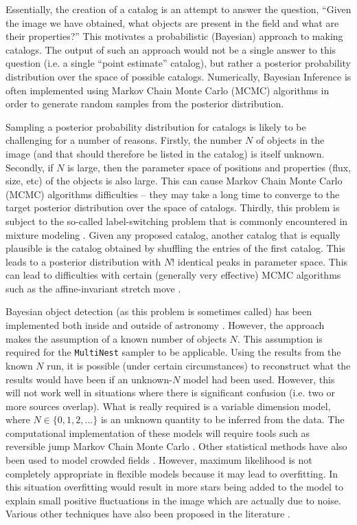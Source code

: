 \documentclass[12pt, preprint]{aastex}
\begin{document}
Essentially, the creation of a catalog is an attempt to answer the question,
``Given the image we have obtained, what objects are present in the field and
what are their properties?'' This motivates a probabilistic (Bayesian)
approach to making catalogs. The output of such an approach would not be a
single answer to this question (i.e. a single ``point estimate'' catalog), but
rather a posterior probability distribution over the space of possible catalogs.
Numerically, Bayesian Inference is often implemented using Markov Chain Monte
Carlo (MCMC) algorithms in order to generate random samples from the posterior
distribution.

Sampling a posterior probability distribution for catalogs is likely to be
challenging for a number of reasons. Firstly, the number $N$ of objects in the
image (and that should therefore be listed in the catalog) is itself unknown.
Secondly, if $N$ is large, then the parameter space
of positions and properties (flux, size, etc) of the objects is also large.
This can cause Markov Chain Monte Carlo (MCMC) algorithms difficulties -- they
may take a long time to converge to the target posterior distribution over
the space of catalogs. Thirdly, this problem is subject to the so-called
label-switching problem that is commonly encountered in mixture modeling
\citep[e.g.][]{label_switching}. Given any proposed catalog, another catalog that is
equally plausible is the catalog obtained by shuffling the entries of the first
catalog. This leads to a posterior distribution with $N!$ identical peaks in
parameter space. This can lead to difficulties with certain (generally very
effective) MCMC algorithms such as the affine-invariant stretch move
\citep{goodman, emcee}.

Bayesian object detection (as this problem is sometimes called) has been
implemented both inside and outside of astronomy
\citep[e.g.][]{object, 2011MNRAS.415.3462F}. However, the
\citet{2011MNRAS.415.3462F} approach makes the assumption of a
known number of objects $N$.
This assumption is required for the
{\tt MultiNest} sampler \citep{multinest} to be applicable.
Using the results from the known $N$
run, it is possible (under certain circumstances) to reconstruct what the
results would have been if an unknown-$N$ model had been used. However,
this will not work well in situations where there is significant confusion
(i.e. two or more sources overlap). What is really required is a variable
dimension model, where $N \in \{0, 1, 2, ... \}$ is an unknown quantity to be
inferred from the data.
The computational implementation of these models will require tools such as
reversible jump Markov Chain Monte Carlo \citep{rjmcmc}. Other statistical
methods have also been used to model crowded fields
\citep[e.g. maximum likelihood,][]{irwin}.
However, maximum likelihood is not completely appropriate in flexible models
because it may lead to overfitting. In this situation overfitting would result
in more stars being added to the model to explain small positive fluctuations
in the image which are actually due to noise. Various other techniques have
also been proposed in the literature \citep[e.g.][]{2002MNRAS.335...73M, 2007A&A...461..373M, 2009PASP..121.1429Z}.
\end{document}

